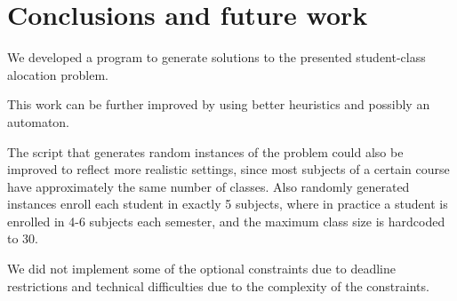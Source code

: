 \documentclass[runningheads]{llncs}
\begin{document}
\section{Conclusions and future work}

We developed a program to generate solutions to the presented student-class alocation problem.

This work can be further improved by using better heuristics and possibly an automaton.

The script that generates random instances of the problem could also be improved to reflect more realistic settings, since most subjects of a certain course have approximately the same number of classes. Also randomly generated instances enroll each student in exactly 5 subjects, where in practice a student is enrolled in 4-6 subjects each semester, and the maximum class size is hardcoded to 30.

We did not implement some of the optional constraints due to deadline restrictions and technical difficulties due to the complexity of the constraints.

%
%



\end{document}

